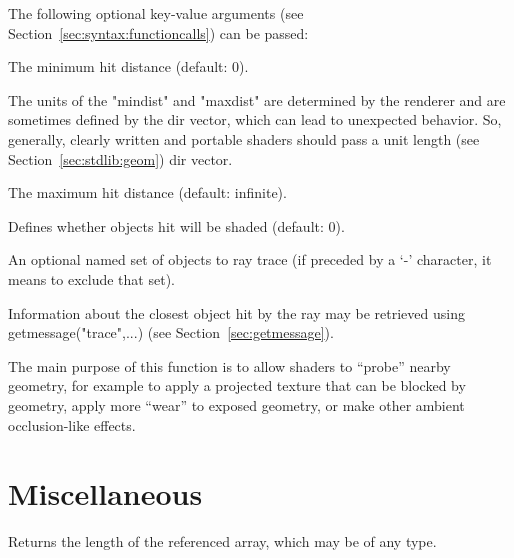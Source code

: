 \documentclass[11pt,letterpaper]{book}
\begin{document}
The following optional key-value arguments 
(see Section~\ref{sec:syntax:functioncalls}) can be passed:

\vspace{12pt}
The minimum hit distance (default: 0).

The units of the {\cf "mindist"} and {\cf "maxdist"} are determined by the renderer 
and are sometimes defined by the dir vector, which can lead to unexpected 
behavior.  So, generally, clearly written and portable shaders should pass 
a unit length (see Section~\ref{sec:stdlib:geom}) dir vector.
\apiend
\vspace{-16pt}

\vspace{12pt}
The maximum hit distance (default: infinite).
\apiend
\vspace{-16pt}

\vspace{12pt}
Defines whether objects hit will be shaded (default: 0).  
\apiend
\vspace{-16pt}

\vspace{12pt}
An optional named set of objects to ray trace (if preceded by a `{\cf -}'
character, it means to exclude that set).
\apiend
\vspace{-16pt}

Information about the closest object hit by the ray may be retrieved
using \\ {\cf getmessage("trace",...)} (see Section~\ref{sec:getmessage}).

The main purpose of this function is to allow shaders to ``probe''
nearby geometry, for example to apply a projected texture that can be
blocked by geometry, apply more ``wear'' to exposed geometry, or make
other ambient occlusion-like effects.



\apiend


\section{Miscellaneous}
\label{sec:stdlib:misc}

Returns the length of the referenced array, which may be of any type.
\apiend
\end{document}

